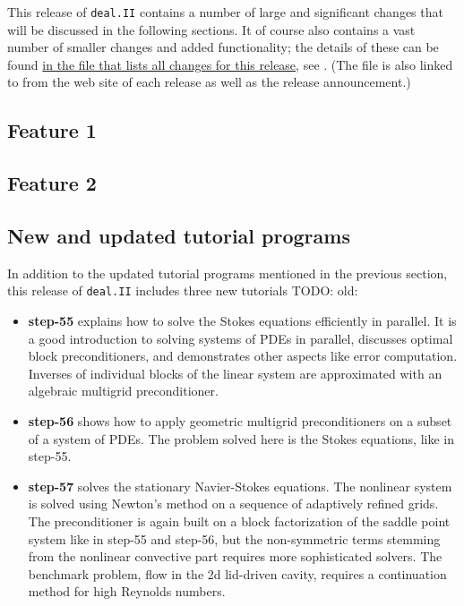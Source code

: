 \documentclass{ansarticle-preprint}
\newcommand{\specialword}[1]{\texttt{#1}}
\newcommand{\dealii}{{\specialword{deal.II}}}
\begin{document}
This release of \dealii{} contains a number of large and significant changes
that will be discussed in the following sections. It of course also contains a
vast number of smaller changes and added functionality; the details of these
can be found
\href{https://www.dealii.org/developer/doxygen/deal.II/changes_between_8_5_and_9_0.html}{
in the file that lists all changes for this release}, see \cite{changes90}.
(The file is also linked to from the web site of each release as well as
the release announcement.)


\subsection{Feature 1}

\subsection{Feature 2}


\subsection{New and updated tutorial programs}
In addition to the updated tutorial programs mentioned in the previous
section, this release of \dealii{} includes three new tutorials TODO: old:
\begin{itemize}
 \item {\bf step-55} explains how to solve the Stokes
 equations efficiently in parallel. It is a good introduction to solving
 systems of PDEs in parallel, discusses optimal block
 preconditioners, and demonstrates other aspects like error computation.
 Inverses of individual blocks of the linear system are approximated with an algebraic
 multigrid preconditioner.

 \item {\bf step-56} shows how to apply geometric multigrid
 preconditioners on a subset of a system of PDEs. The problem solved here is the
 Stokes equations, like in step-55.

 \item {\bf step-57} solves the stationary Navier-Stokes equations.
 The nonlinear system is solved using Newton's method on a sequence of adaptively refined
 grids. The preconditioner is again built on a block factorization of the saddle point
 system like in step-55 and step-56, but the non-symmetric terms stemming from the
 nonlinear convective part requires more sophisticated solvers. The benchmark problem,
 flow in the 2d lid-driven cavity, requires a continuation method for high Reynolds
 numbers.
 \end{itemize}
\end{document}
